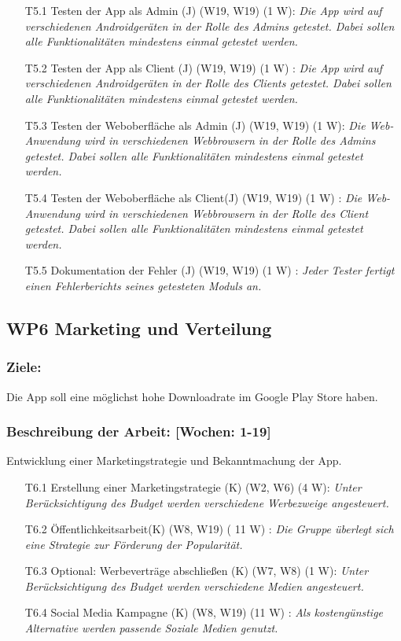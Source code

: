 \documentclass{report}
\begin{document}
\begin{enumerate}
\item [T5.1] Testen der App als Admin (J) (W19, W19) (1 W): \emph{ Die App wird auf verschiedenen Androidgeräten in der Rolle des Admins getestet. Dabei sollen alle Funktionalitäten mindestens einmal getestet werden.}
\item [T5.2] Testen der App als Client (J) (W19, W19) (1 W) : \emph{ Die App wird auf verschiedenen Androidgeräten in der Rolle des Clients getestet. Dabei sollen alle Funktionalitäten mindestens einmal getestet werden.}
\item [T5.3] Testen der Weboberfläche als Admin (J) (W19, W19) (1 W): \emph{ Die Web-Anwendung wird in verschiedenen Webbrowsern in der Rolle des Admins getestet. Dabei sollen alle Funktionalitäten mindestens einmal getestet werden.}
\item [T5.4] Testen der Weboberfläche als Client(J) (W19, W19) (1 W) : \emph{ Die Web-Anwendung wird in verschiedenen Webbrowsern in der Rolle des Client getestet. Dabei sollen alle Funktionalitäten mindestens einmal getestet werden.}
\item [T5.5] Dokumentation der Fehler (J) (W19, W19) (1 W) : \emph{Jeder Tester fertigt einen Fehlerberichts seines getesteten Moduls an.}
\end{enumerate}

\subsection*{WP6 Marketing und Verteilung}

\subsubsection{Ziele:} Die App soll eine möglichst hohe Downloadrate im Google Play Store haben.
\subsubsection{Beschreibung der Arbeit: [Wochen: 1-19]} Entwicklung einer Marketingstrategie und Bekanntmachung der App.

\begin{enumerate}
\item [T6.1] Erstellung einer Marketingstrategie (K) (W2, W6) (4 W): \emph{Unter Berücksichtigung des Budget werden verschiedene Werbezweige angesteuert.}
\item [T6.2] Öffentlichkeitsarbeit(K) (W8, W19) ( 11 W) : \emph{ Die Gruppe überlegt sich eine Strategie zur Förderung der Popularität.}
\item [T6.3] Optional: Werbeverträge abschließen (K) (W7, W8) (1 W): \emph{ Unter Berücksichtigung des Budget werden verschiedene Medien angesteuert.}
\item [T6.4] Social Media Kampagne (K) (W8, W19) (11 W) : \emph{ Als kostengünstige Alternative werden passende Soziale Medien genutzt.}
\end{enumerate}
\end{document}
